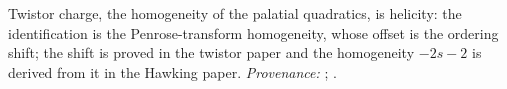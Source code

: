 Twistor charge, the homogeneity of the palatial quadratics, is helicity: the identification is the Penrose-transform homogeneity, whose offset is the ordering shift; the shift is proved in the twistor paper and the homogeneity $-2s-2$ is derived from it in the Hawking paper. \emph{Provenance:} \cite[Thm.~5.7]{ButlerT9}; \cite[Prop.~5.2]{ButlerT7}.

